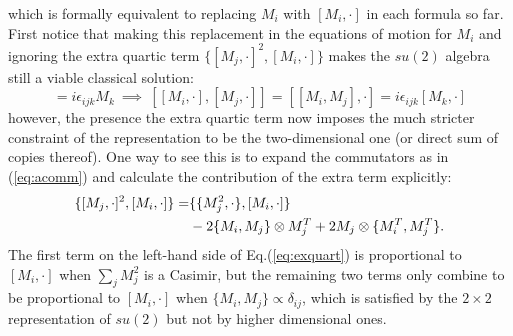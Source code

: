 which is formally equivalent to replacing $M_i$ with $[M_i, \cdot ]$ in each formula so far. First notice that making this replacement in the equations of motion for $M_i$ and ignoring the extra quartic term $\{[M_j, \cdot ]^2, [M_i, \cdot ] \}$ makes the $su(2)$ algebra still a viable classical solution: 
\begin{equation}
[M_i, M_j] = i \epsilon_{ijk} M_k \ \implies \ [[M_i, \cdot ], [M_j, \cdot ]] = [[M_i, M_j], \cdot ] = i \epsilon_{ijk} [M_k, \cdot ]
\end{equation}
however, the presence the extra quartic term now imposes the much stricter constraint of the representation to be the two-dimensional one (or direct sum of copies thereof). One way to see this is to expand the commutators as in (\ref{eq:acomm}) and calculate the contribution of the extra term explicitly:
\begin{align}\label{eq:exquart}
\{[M_j, \cdot ]^2, [M_i, \cdot ] \} = &\{ \{M_j^2, \cdot\}, [M_i, \cdot ] \} \\ \notag
& -2 \{ M_i , M_j \} \otimes M_j^T + 2 M_j \otimes \{ M_i^T, M_j^T \}.
\end{align}
The first term on the left-hand side of Eq.(\ref{eq:exquart}) is proportional to $[M_i, \cdot ]$ when $\sum_j M_j^2$ is a Casimir, but the remaining two terms only combine to be proportional to $[M_i, \cdot ]$ when $\{ M_i, M_j \} \propto \delta_{ij}$, which is satisfied by the $2 \times 2$ representation of $su(2)$ but not by higher dimensional ones.  




